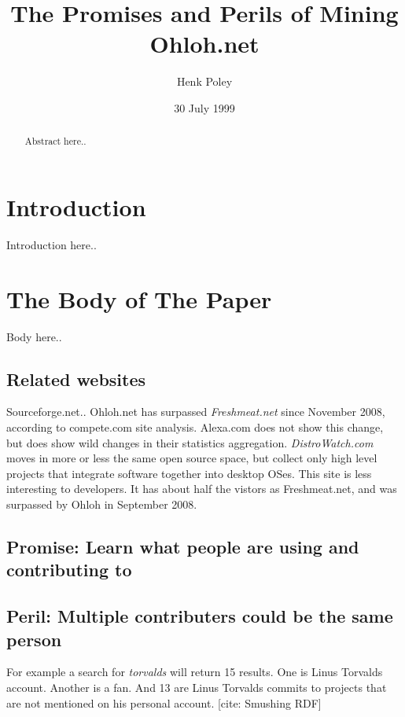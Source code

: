 \documentclass{sig-alternate}
\begin{document}
\toappear{} %

\title{The Promises and Perils of Mining Ohloh.net}

\author{
\alignauthor
Henk Poley
}
\date{30 July 1999}

\maketitle
\begin{abstract}
Abstract here..
\end{abstract}


\section{Introduction}
Introduction here..


\section{The {\secit Body} of The Paper}
Body here..

\subsection{Related websites}
Sourceforge.net..
Ohloh.net has surpassed \emph{Freshmeat.net} since November 2008, according to compete.com site analysis. Alexa.com does not show this change, but does show wild changes in their statistics aggregation.
\emph{DistroWatch.com} moves in more or less the same open source space, but collect only high level projects that integrate software together into desktop OSes. This site is less interesting to developers. It has about half the vistors as Freshmeat.net, and was surpassed by Ohloh in September 2008.


\subsection{Promise: Learn what people are using and contributing to}

\subsection{Peril: Multiple contributers could be the same person}
For example a search for \emph{torvalds} will return 15 results. One is Linus Torvalds account. Another is a fan. And 13 are Linus Torvalds commits to projects that are not mentioned on his personal account.
[cite: Smushing RDF]
\end{document}
